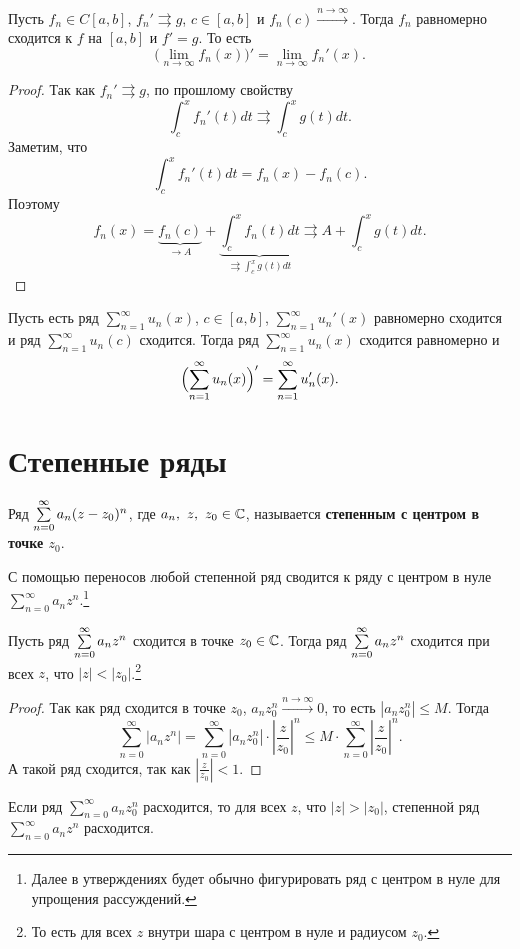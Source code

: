 \begin{enumerate}
	Пусть $ f_n \in C[a, b]$, $ f_n' \rightrightarrows g$, $ c \in  [a, b]$ и $ f_n(c) \stackrel{n \to \infty}{\longrightarrow}$. 
	Тогда $ f_n$ равномерно сходится к $ f$ на $ [a, b]$ и $ f' = g$.
	То есть
	\[
		\bigl( \lim_{n \to \infty} f_n(x) \bigr)' = \lim_{n \to \infty} f_n'(x)
	.\] 
	\begin{proof}
		Так как $ f_n ' \rightrightarrows g$, по прошлому свойству 
		\[
			\int_{c}^{x} f_n'(t) dt \rightrightarrows \int_{c}^{x} g(t) dt  
		.\] 
		Заметим, что
		\[
			\int_{c}^{x} f_n'(t) dt  = f_n(x) - f_n(c)
		.\] 
		Поэтому
		\[
			f_n(x) = \underbrace{f_n(c)}_{ \to A} + \underbrace{\int_{c}^{x} f_n(t) dt}_{\rightrightarrows \int_{c}^{x} g(t) dt   } \rightrightarrows A + \int_{c}^{x} g(t) dt 
		.\] 
	\end{proof}
	\begin{cor}
		Пусть есть ряд $ \sum_{n=1}^{\infty} u_n(x)$, $ c \in [a, b]$, $ \sum_{n=1}^{\infty} u_n'(x)$ равномерно сходится и ряд $ \sum_{n=1}^{\infty} u_n(c) $ сходится. Тогда ряд $ \sum_{n=1}^{\infty} u_n(x)$ сходится равномерно и
		\[
			\Bigl(\sum_{n=1}^{\infty} u_n(x)\Bigr)' = \sum_{n=1}^{\infty} u_n'(x)
		.\] 
	\end{cor}
\end{enumerate}

\section{Степенные ряды}
\begin{defn}
	Ряд $ \sum\limits_{n=0}^{\infty} a_n(z-z_0)^{n}$, где $ a_n, ~ z, ~ z_0 \in \mathbb{C}$, называется {\bf степенным с центром в точке $ z_0$}. 
\end{defn}
\begin{note}
	С помощью переносов любой степенной ряд сводится к ряду с центром в нуле $ \sum_{n=0}^{\infty}a_n z^{n} $.\footnote{Далее в утверждениях будет обычно фигурировать ряд с центром в нуле для упрощения рассуждений.}
\end{note}
\begin{thm}
Пусть ряд $ \sum\limits_{n=0}^{\infty} a_n z^{n}$ сходится в точке $ z_0 \in \mathbb{C}$. Тогда ряд $ \sum\limits_{n=0}^{\infty} a_n z^{n}$ сходится при всех $ z$, что $ \lvert z \rvert < \lvert z_0 \rvert $.\footnote{То есть для всех $ z$ внутри шара с центром в нуле и радиусом  $ z_0$.}
\end{thm}
\begin{proof}
    Так как ряд сходится в точке $ z_0$, $ a_n z_0^{n} \stackrel{n \to  \infty}{\longrightarrow} 0$, то есть $ \left| a_n z_0^{n} \right| \le M$.
	Тогда
	\[
		\sum_{n=0}^{\infty} \left| a_n z^{n}\right|  = \sum_{n=0}^{\infty} \left| a_n z_0^{n} \right| \cdot \left| \frac{z}{z_0} \right| ^{n} \le M \cdot \sum_{n=0}^{\infty} \left| \frac{z}{z_0} \right| ^{n}
	.\] 
	А такой ряд сходится, так как $ \left| \frac{z}{z_0} \right| < 1$.
\end{proof}
\begin{cor}
    Если ряд $ \sum\limits_{n=0}^{\infty} a_n z^{n}_0 $ расходится, то для всех $ z$, что  $ \lvert z \rvert >\lvert z_0 \rvert $, степенной ряд $ \sum\limits_{n=0}^{\infty} a_n z^{n}$ расходится.
\end{cor}

